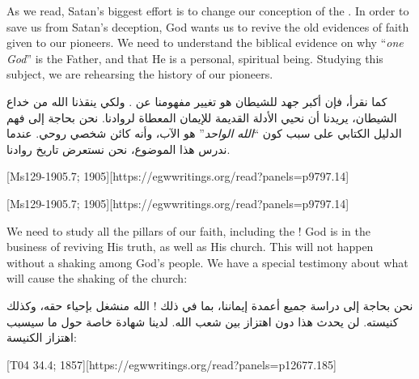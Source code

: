 As we read, Satan’s biggest effort is to change our conception of the . In order to save us from Satan’s deception, God wants us to revive the old evidences of faith given to our pioneers. We need to understand the biblical evidence on why “\textit{one God}” is the Father, and that He is a personal, spiritual being. Studying this subject, we are rehearsing the history of our pioneers.


كما نقرأ، فإن أكبر جهد للشيطان هو تغيير مفهومنا عن . ولكي ينقذنا الله من خداع الشيطان، يريدنا أن نحيي الأدلة القديمة للإيمان المعطاة لروادنا. نحن بحاجة إلى فهم الدليل الكتابي على سبب كون “\textit{الله الواحد}” هو الآب، وأنه كائن شخصي روحي. عندما ندرس هذا الموضوع، نحن نستعرض تاريخ روادنا.


[Ms129-1905.7; 1905][https://egwwritings.org/read?panels=p9797.14]


[Ms129-1905.7; 1905][https://egwwritings.org/read?panels=p9797.14]


We need to study all the pillars of our faith, including the ! God is in the business of reviving His truth, as well as His church. This will not happen without a shaking among God’s people. We have a special testimony about what will cause the shaking of the church:


نحن بحاجة إلى دراسة جميع أعمدة إيماننا، بما في ذلك ! الله منشغل بإحياء حقه، وكذلك كنيسته. لن يحدث هذا دون اهتزاز بين شعب الله. لدينا شهادة خاصة حول ما سيسبب اهتزاز الكنيسة:


[T04 34.4; 1857][https://egwwritings.org/read?panels=p12677.185]



